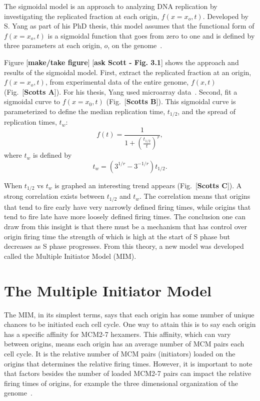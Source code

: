 	The sigmoidal model is an approach to analyzing DNA replication by investigating the replicated fraction at each origin, $f(x=x_o,t)$.
	Developed by S. Yang as part of his PhD thesis, this model assumes that the functional form of $f(x=x_o,t)$ is a sigmoidal function that goes from zero to one and is defined by three parameters at each origin, $o$, on the genome~\cite{ScottsPaper,ScottsThesis}.
	
	Figure [\textbf{make/take figure}] [\textbf{ask Scott - Fig. 3.1}] shows the approach and results of the sigmoidal model.
	First, extract the replicated fraction at an origin, $f(x=x_o,t)$, from experimental data of the entire genome, $f(x,t)$ (Fig.~[\textbf{Scotts A}]).
	For his thesis, Yang used microarray data~\cite{McCuneMicroArray}.
	Second, fit a sigmoidal curve to $f(x=x_0,t)$ (Fig.~[\textbf{Scotts B}]).
	This sigmoidal curve is parameterized to define the median replication time, $t_{1/2}$, and the spread of replication times, $t_w$:
	\begin{equation} \label{eq:SigmoidalModel}
		f(t) = {\frac{1}{1+({\frac{t_{1/2}}{t}})^r}},
	\end{equation}
	where $t_w$ is defined by
	\begin{equation}
		t_w = (3^{1/r}-3^{-1/r})t_{1/2}.
	\end{equation}
	
	When $t_{1/2}$ vs $t_w$ is graphed an interesting trend appears (Fig.~[\textbf{Scotts C}]).
	A strong correlation exists between $t_{1/2}$ and $t_w$.
	The correlation means that origins that tend to fire early have very narrowly defined firing times, while origins that tend to fire late have more loosely defined firing times.
	The conclusion one can draw from this insight is that there must be a mechanism that has control over origin firing time the strength of which is high at the start of S phase but decreases as S phase progresses\cite{ScottsThesis}.
	From this theory, a new model was developed called the Multiple Initiator Model (MIM).
	
	
	\section{The Multiple Initiator Model}
	\label{sec:MIM}
	
	The MIM, in its simplest terms, says that each origin has some number of unique chances to be initiated each cell cycle.
	One way to attain this is to say each origin has a specific affinity for MCM2-7 hexamers.
	This affinity, which can vary between origins, means each origin has an average number of MCM pairs each cell cycle.
	It is the relative number of MCM pairs (initiators) loaded on the origins that determines the relative firing times.
	However, it is important to note that factors besides the number of loaded MCM2-7 pairs can impact the relative firing times of origins, for example the three dimensional organization of the genome~\cite{}.~\cite{ScottsThesis}
	
